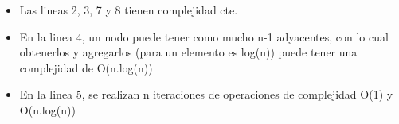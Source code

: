 \begin{itemize}
\item Las lineas 2, 3, 7 y 8 tienen complejidad cte.
\item En la linea 4, un nodo puede tener como mucho n-1 adyacentes, con lo cual obtenerlos y agregarlos (para un elemento es log(n)) puede tener una complejidad de O(n.log(n))
\item En la linea 5, se realizan n iteraciones de operaciones de complejidad O(1) y O(n.log(n))  
\end{itemize}
